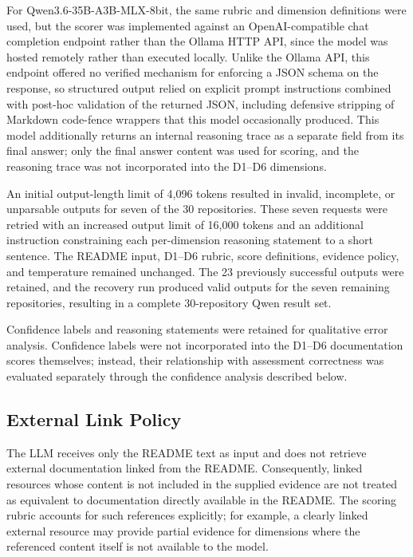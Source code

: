 For Qwen3.6-35B-A3B-MLX-8bit, the same rubric and dimension definitions 
were used, but the scorer was implemented against an OpenAI-compatible chat 
completion endpoint rather than the Ollama HTTP API, since the model was hosted 
remotely rather than executed locally. Unlike the Ollama API, this endpoint offered 
no verified mechanism for enforcing a JSON schema on the response, so structured output 
relied on explicit prompt instructions combined with post-hoc validation of the returned 
JSON, including defensive stripping of Markdown code-fence wrappers that this model occasionally 
produced. This model additionally returns an internal reasoning trace as a separate field from its 
final answer; only the final answer content was used for scoring, and the reasoning trace was not 
incorporated into the D1--D6 dimensions.

An initial output-length limit of 4{,}096 tokens resulted in invalid, incomplete, or unparsable 
outputs for seven of the 30 repositories. These seven requests were retried with an increased 
output limit of 16{,}000 tokens and an additional instruction constraining each per-dimension 
reasoning statement to a short sentence. The README input, D1--D6 rubric, score definitions, 
evidence policy, and temperature remained unchanged. The 23 previously successful outputs 
were retained, and the recovery run produced valid outputs for the seven remaining repositories, 
resulting in a complete 30-repository Qwen result set.

Confidence labels and reasoning statements were retained for
qualitative error analysis. Confidence labels were not incorporated
into the D1--D6 documentation scores themselves; instead, their
relationship with assessment correctness was evaluated separately
through the confidence analysis described below.

\subsection{External Link Policy}

The LLM receives only the README text as input and does not retrieve
external documentation linked from the README. Consequently, linked
resources whose content is not included in the supplied evidence are
not treated as equivalent to documentation directly available in the
README. The scoring rubric accounts for such references explicitly;
for example, a clearly linked external resource may provide partial
evidence for dimensions where the referenced content itself is not
available to the model.


